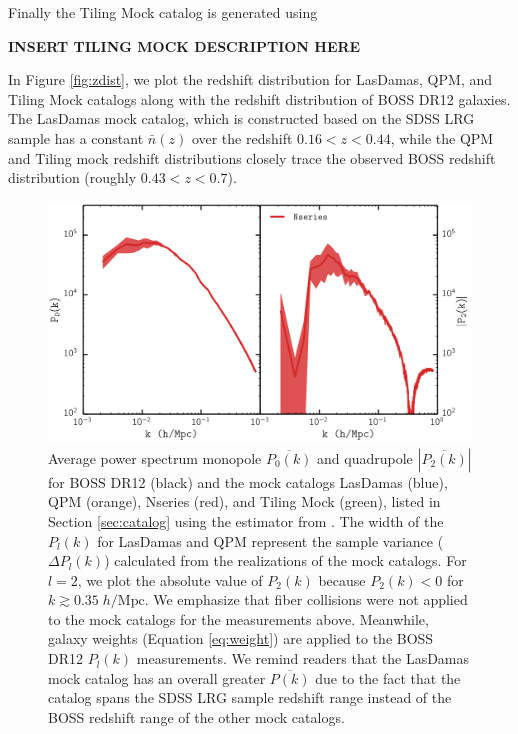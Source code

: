 \documentclass{emulateapj}
\begin{document}
Finally the Tiling Mock catalog is generated using 

{\bf INSERT TILING MOCK DESCRIPTION HERE}

In Figure \ref{fig:zdist}, we plot the redshift distribution for LasDamas, QPM, and Tiling Mock catalogs along with the redshift distribution of BOSS DR12 galaxies. The LasDamas mock catalog, which is constructed based on the SDSS LRG sample has a constant $\bar{n}(z)$ over the redshift $0.16 < z< 0.44$, while the QPM and Tiling mock redshift distributions closely trace the observed BOSS redshift distribution (roughly $0.43 < z < 0.7$). 

\begin{figure}
\begin{center}
\includegraphics[scale=0.5]{mock_catalog_Plk.png} 
\caption{Average power spectrum monopole $\overline{P_0(k)}$ and quadrupole $|\overline{P_2(k)}|$ for BOSS DR12 (black) and the mock catalogs LasDamas (blue), QPM (orange), Nseries (red), and Tiling Mock (green), listed in Section \ref{sec:catalog} using the estimator from \cite{Scoccimarro:2015aa}. The width of the $P_{l}(k)$ for LasDamas and QPM represent the sample variance ($\Delta P_{l}(k)$) calculated from the realizations of the mock catalogs. For $l = 2$, we plot the absolute value of $P_2(k)$ because $P_2(k) < 0$ for $k \gtrsim 0.35\;h/\mathrm{Mpc}$. We emphasize that fiber collisions were not applied to the mock catalogs for the measurements above. Meanwhile, galaxy weights (Equation \ref{eq:weight}) are applied to the BOSS DR12 $P_l(k)$ measurements. We remind readers that the LasDamas mock catalog has an overall greater $\overline{P(k)}$ due to the fact that the catalog spans the SDSS LRG sample redshift range instead of the BOSS redshift range of the other mock catalogs.} \label{fig:mockpk}
\end{center}
\end{figure}
\end{document}
